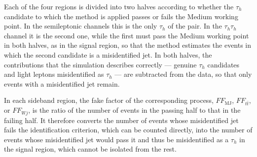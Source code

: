 Each of the four regions is divided into two halves according to whether the $\tau_h$ candidate to which the method is applied passes or fails the Medium working point. In the semileptonic channels this is the only $\tau_h$ of the pair. In the $\tau_h\tau_h$ channel it is the second one, while the first must pass the Medium working point in both halves, as in the signal region, so that the method estimates the events in which the second candidate is a misidentified jet. In both halves, the contributions that the simulation describes correctly — genuine $\tau_h$ candidates and light leptons misidentified as $\tau_h$ — are subtracted from the data, so that only events with a misidentified jet remain.

In each sideband region, the fake factor of the corresponding process, $FF_\text{MJ}$, $FF_{t\bar{t}}$, or $FF_{Wj}$, is the ratio of the number of events in the passing half to that in the failing half. It therefore converts the number of events whose misidentified jet fails the identification criterion, which can be counted directly, into the number of events whose misidentified jet would pass it and thus be misidentified as a $\tau_h$ in the signal region, which cannot be isolated from the rest.

